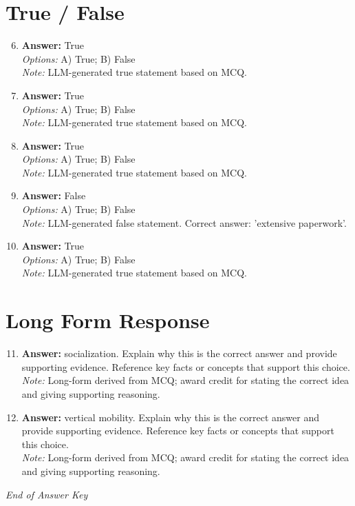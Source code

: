 \documentclass[12pt]{article}
\begin{document}
\section*{True / False}
\begin{enumerate}[label=\arabic*.]
\setcounter{enumi}{5}
\item \textbf{Answer:} True
\\ \textit{Options:} A) True; B) False
\\ \textit{Note:} LLM-generated true statement based on MCQ.
\item \textbf{Answer:} True
\\ \textit{Options:} A) True; B) False
\\ \textit{Note:} LLM-generated true statement based on MCQ.
\item \textbf{Answer:} True
\\ \textit{Options:} A) True; B) False
\\ \textit{Note:} LLM-generated true statement based on MCQ.
\item \textbf{Answer:} False
\\ \textit{Options:} A) True; B) False
\\ \textit{Note:} LLM-generated false statement. Correct answer: 'extensive paperwork'.
\item \textbf{Answer:} True
\\ \textit{Options:} A) True; B) False
\\ \textit{Note:} LLM-generated true statement based on MCQ.
\end{enumerate}

\section*{Long Form Response}
\begin{enumerate}[label=\arabic*.]
\setcounter{enumi}{10}
\item \textbf{Answer:} socialization. Explain why this is the correct answer and provide supporting evidence. Reference key facts or concepts that support this choice.
\\ \textit{Note:} Long-form derived from MCQ; award credit for stating the correct idea and giving supporting reasoning.
\item \textbf{Answer:} vertical mobility. Explain why this is the correct answer and provide supporting evidence. Reference key facts or concepts that support this choice.
\\ \textit{Note:} Long-form derived from MCQ; award credit for stating the correct idea and giving supporting reasoning.
\end{enumerate}

\vfill
\noindent\textit{End of Answer Key}
\end{document}
